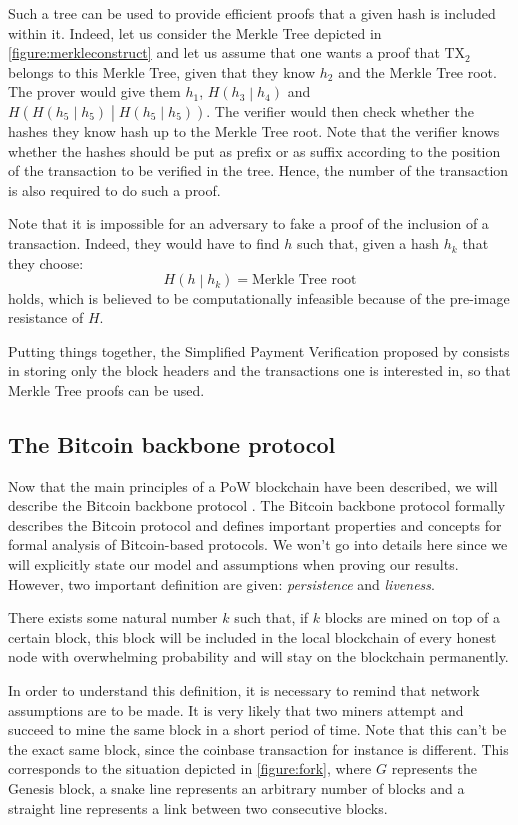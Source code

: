         Such a tree can be used to provide efficient proofs that a given hash is included within it. Indeed, let us consider the Merkle Tree depicted in \autoref{figure:merkleconstruct} and let us assume that one wants a proof that \(\text{TX}_2\) belongs to this Merkle Tree, given that they know \(h_2\) and the Merkle Tree root. The prover would give them \(h_1\), \(H\left(h_3\middle|h_4\right)\) and \(H\left(H\left(h_5\middle|h_5\right)\middle|H\left(h_5\middle|h_5\right)\right)\). The verifier would then check whether the hashes they know hash up to the Merkle Tree root. Note that the verifier knows whether the hashes should be put as prefix or as suffix according to the position of the transaction to be verified in the tree. Hence, the number of the transaction is also required to do such a proof.
        
        Note that it is impossible for an adversary to fake a proof of the inclusion of a transaction. Indeed, they would have to find \(h\) such that, given a hash \(h_k\) that they choose:
        \[H\left(h\middle|h_k\right)=\text{Merkle Tree root}\]
        holds, which is believed to be computationally infeasible because of the pre-image resistance of \(H\).
        
        Putting things together, the Simplified Payment Verification proposed by \citeauthor{Bitcoin} consists in storing only the block headers and the transactions one is interested in, so that Merkle Tree proofs can be used.

    \subsection{The Bitcoin backbone protocol}
        \label{subsec:backbone}
        Now that the main principles of a PoW blockchain have been described, we will describe the Bitcoin backbone protocol \cite{Backbone}. The Bitcoin backbone protocol formally describes the Bitcoin protocol and defines important properties and concepts for formal analysis of Bitcoin-based protocols. We won't go into details here since we will explicitly state our model and assumptions when proving our results. However, two important definition are given: \textit{persistence} and \textit{liveness}.
        \begin{Definition}
            There exists some natural number \(k\) such that, if \(k\) blocks are mined on top of a certain block, this block will be included in the local blockchain of every honest node with overwhelming probability and will stay on the blockchain permanently.
        \end{Definition}
        In order to understand this definition, it is necessary to remind that network assumptions are to be made. It is very likely that two miners attempt and succeed to mine the same block in a short period of time. Note that this can't be the exact same block, since the coinbase transaction for instance is different. This corresponds to the situation depicted in \autoref{figure:fork}, where \(G\) represents the Genesis block, a snake line represents an arbitrary number of blocks and a straight line represents a link between two consecutive blocks. 
        
